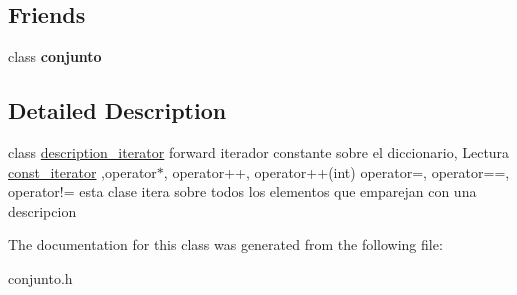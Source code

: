 \subsection*{Friends}
\begin{DoxyCompactItemize}
\item 
\hypertarget{classconjunto_1_1description__iterator_a42fdcda39c77eabd7380e29fcdbe5dd2}{class {\bfseries conjunto}}\label{classconjunto_1_1description__iterator_a42fdcda39c77eabd7380e29fcdbe5dd2}

\end{DoxyCompactItemize}


\subsection{Detailed Description}
class \hyperlink{classconjunto_1_1description__iterator}{description\-\_\-iterator} forward iterador constante sobre el diccionario, Lectura \hyperlink{classconjunto_1_1const__iterator}{const\-\_\-iterator} ,operator$\ast$, operator++, operator++(int) operator=, operator==, operator!= esta clase itera sobre todos los elementos que emparejan con una descripcion 

The documentation for this class was generated from the following file\-:\begin{DoxyCompactItemize}
\item 
conjunto.\-h\end{DoxyCompactItemize}
